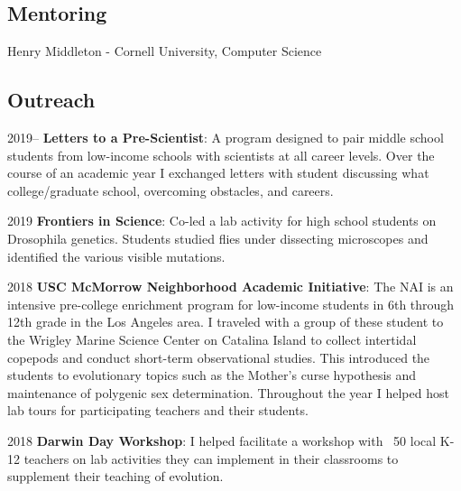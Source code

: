 \documentclass[12pt,letterpaper]{report}
\newcommand{\listitemspace}{0.15em}
\renewenvironment{itemize}
{\begin{list}{}{\setlength{\leftmargin}{0em}
            \setlength{\parskip}{0em}
            \setlength{\itemsep}{\listitemspace}
            \setlength{\parsep}{\listitemspace}}}
    {\end{list}}
\begin{document}
    \subsection*{Mentoring}

    \begin{itemize}
    	
    	\item	Henry Middleton - Cornell University, Computer Science
        
    \end{itemize}

    \subsection*{Outreach}

    \begin{tablist}
    
    	\item[2019--] \tab \textbf{Letters to a Pre-Scientist}: A program designed to pair middle school students from low-income schools with scientists at all career levels. Over the course of an academic year I exchanged letters with student discussing what college/graduate school, overcoming obstacles, and careers.
        
        \item[2019] \tab \textbf{Frontiers in Science}: Co-led a lab activity for high school students on Drosophila genetics. Students studied flies under dissecting microscopes and identified the various visible mutations. 
        
        \item[2018] \tab \textbf{USC McMorrow Neighborhood Academic Initiative}: The NAI is an intensive pre-college enrichment program for low-income students in 6th through 12th grade in the Los Angeles area. I traveled with a group of these student to the Wrigley Marine Science Center on Catalina Island to collect intertidal copepods and conduct short-term observational studies. This introduced the students to evolutionary topics such as the Mother’s curse hypothesis and maintenance of polygenic sex determination. Throughout the year I helped host lab tours for participating teachers and their students.
        
        \item[2018] \tab \textbf{Darwin Day Workshop}: I helped facilitate a workshop with ~50 local K-12 teachers on lab activities they can implement in their classrooms to supplement their teaching of evolution.

    \end{tablist}
\end{document}
